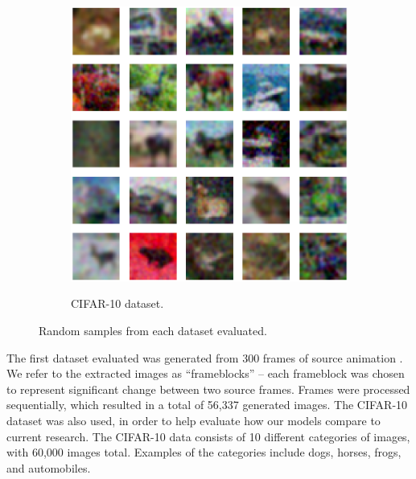 \documentclass[letterpaper]{article} %
\begin{document}
\begin{figure}[h!]
\begin{subfigure}{0.22\textwidth}
\begin{center}
\begin{minipage}[t]{0.95\linewidth}
\begin{centering}
{\includegraphics[width=\linewidth]{cifar_samplesxrange.png}}
\caption{CIFAR-10 dataset.}
\label{fig:cifar_dataset}
\end{centering}
\end{minipage}
\end{center}
\end{subfigure}
\caption{Random samples from each dataset evaluated.}
\label{fig:datasets}
\end{figure}

The first dataset evaluated was generated from 300 frames of source animation \cite{animation}.
We refer to the extracted images as ``frameblocks'' --
each frameblock was chosen to represent significant change between two source frames.
Frames were processed sequentially, which resulted in a total of 56,337 generated images.
The CIFAR-10 dataset was also used, in order to help evaluate how our models
compare to current research.
The CIFAR-10 data consists of 10 different categories of images, with 60,000 images total.
Examples of the categories include dogs, horses, frogs, and automobiles.
\end{document}
